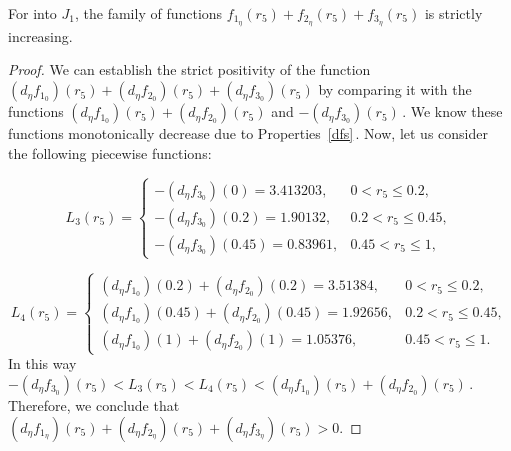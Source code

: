 \documentclass[10pt,a4paper]{amsart}
\begin{document}
\begin{proposition}\label{aux2}
For into $J_{1}$, the family of functions $f_{1_{\eta}}(r_{5})+f_{2_{\eta}}(r_{5})+f_{3_{\eta}}(r_{5})$ is strictly increasing.
\end{proposition}

\begin{proof}
We can establish the strict positivity of the function $\left(d_{\eta}f_{1_{0}}\right)(r_{5})+\left(d_{\eta}f_{2_{0}}\right)(r_{5}) +\left(d_{\eta}f_{3_{0}}\right)(r_{5})$ by comparing it with the functions $\left(d_{\eta}f_{1_{0}}\right)(r_{5})+\left(d_{\eta}f_{2_{0}}\right)(r_{5})$ and $-\left(d_{\eta}f_{3_{0}}\right)(r_{5})$\,. We know these functions monotonically decrease due to Properties~\ref{dfs}\,. Now, let us consider the following piecewise functions:

\begin{equation*}
L_{3}(r_5)= \left\{ \begin{array}{lll}
             -\left(d_{\eta}f_{3_{0}}\right)(0)=3.413203,  &0<r_{5}\leq 0.2, \\
             -\left(d_{\eta}f_{3_{0}}\right)(0.2)=1.90132, & 0.2<r_{5}\leq 0.45,\\
             -\left(d_{\eta}f_{3_{0}}\right)(0.45)=0.83961, & 0.45<r_{5}\leq 1,
\end{array}
   \right.
\end{equation*}

\begin{equation*}
L_{4}(r_5)= \left\{ \begin{array}{lll}
             \left(d_{\eta}f_{1_{0}}\right)(0.2)+ \left(d_{\eta}f_{2_{0}}\right)(0.2)=3.51384,  &0<r_{5}\leq 0.2, \\
             \left(d_{\eta}f_{1_{0}}\right)(0.45)+ \left(d_{\eta}f_{2_{0}}\right)(0.45)=1.92656, & 0.2<r_{5}\leq 0.45,\\
             \left(d_{\eta}f_{1_{0}}\right)(1)+ \left(d_{\eta}f_{2_{0}}\right)(1)=1.05376, & 0.45<r_{5}\leq 1.
\end{array}
   \right.
\end{equation*}
In this way $-\left(d_{\eta}f_{3_{0}}\right)(r_{5})<L_{3}(r_{5})<L_{4}(r_{5})<\left(d_{\eta}f_{1_{0}}\right)(r_{5})+\left(d_{\eta}f_{2_{0}}\right)(r_{5})$\,. Therefore, we conclude that $\left(d_{\eta}f_{1_{\eta}}\right)(r_{5})+\left(d_{\eta}f_{2_{\eta}}\right)(r_{5})+\left(d_{\eta}f_{3_{\eta}}\right)(r_{5})>0$.
\end{proof}
\end{document}
